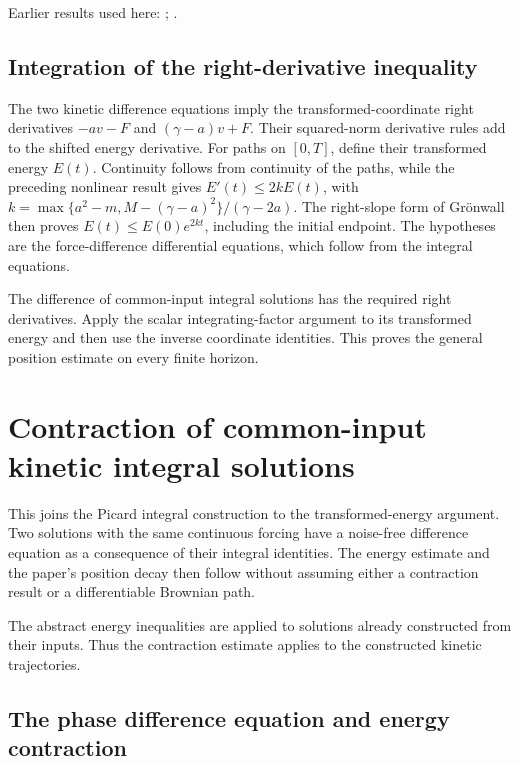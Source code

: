\documentclass[11pt,a4paper]{report}
\begin{document}
Earlier results used here: \cite[Section~3.10.2]{LangevinLean2026ULASC}; \cite[Section~3.10.3]{LangevinLean2026ULASC}.
\subsection{\texorpdfstring{Integration of the right-derivative inequality}{Integration of the right-derivative inequality}}
\label{report-step-KineticLangevin-GeneralContraction-lean-5}


The two kinetic difference equations imply the transformed-coordinate right derivatives \(-av-F\) and \((\gamma-a)v+F\). Their squared-norm derivative rules add to the shifted energy derivative. For paths on \([0,T]\), define their transformed energy \(E(t)\). Continuity follows from continuity of the paths, while the preceding nonlinear result gives \(E'(t)\le2kE(t)\), with \(k=\max\{a^2-m,M-(\gamma-a)^2\}/(\gamma-2a)\). The right-slope form of Grönwall then proves \(E(t)\le E(0)e^{2kt}\), including the initial endpoint. The hypotheses are the force-difference differential equations, which follow from the integral equations.



The difference of common-input integral solutions has the required right derivatives. Apply the scalar integrating-factor argument to its transformed energy and then use the inverse coordinate identities. This proves the general position estimate on every finite horizon.

\section{\texorpdfstring{Contraction of common-input kinetic integral solutions}{Contraction of common-input kinetic integral solutions}}
\label{proof-module-KineticLangevin-SynchronousFlow-lean}


This joins the Picard integral construction to the transformed-energy argument. Two solutions with the same continuous forcing have a noise-free difference equation as a consequence of their integral identities. The energy estimate and the paper's position decay then follow without assuming either a contraction result or a differentiable Brownian path.



The abstract energy inequalities are applied to solutions already constructed from their inputs. Thus the contraction estimate applies to the constructed kinetic trajectories.

\subsection{\texorpdfstring{The phase difference equation and energy contraction}{The phase difference equation and energy contraction}}
\label{report-step-KineticLangevin-SynchronousFlow-lean-1}
\end{document}

